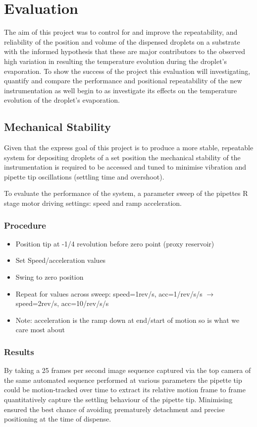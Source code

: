 \chapter{Evaluation}\label{C:eval}

The aim of this project was to control for and improve the repeatability, and reliability of the position and volume of the dispensed droplets on a substrate with the informed hypothesis that these are major contributors to the observed high variation in resulting the temperature evolution during the droplet's evaporation. To show the success of the project this evaluation will investigating, quantify and compare the performance and positional repeatability of the new instrumentation as well begin to as investigate its effects on the temperature evolution of the droplet's evaporation.

\section{Mechanical Stability}

Given that the express goal of this project is to produce a more stable, repeatable system for depositing droplets of a set position the mechanical stability of the instrumentation is required to be accessed and tuned to minimise vibration and pipette tip oscillations (settling time and overshoot).

To evaluate the performance of the system, a parameter sweep of the pipettes R stage motor driving settings: speed and ramp acceleration.
\subsection{Procedure}
\begin{itemize}
    \item Position tip at -1/4 revolution before zero point (proxy reservoir)
    \item Set Speed/acceleration values
    \item Swing to zero position
    \item Repeat for values across sweep: speed=1rev/s, acc=1/rev/s/s $\rightarrow$  speed=2rev/s, acc=10/rev/s/s
    \item Note: acceleration is the ramp down at end/start of motion so is what we care most about
\end{itemize}

\subsection{Results}
By taking a 25 frames per second image sequence captured via the top camera of the same automated sequence performed at various parameters the pipette tip could be motion-tracked over time to extract its relative motion frame to frame quantitatively capture the settling behaviour of the pipette tip. Minimising ensured the best chance of avoiding prematurely detachment and precise positioning at the time of dispense. 

